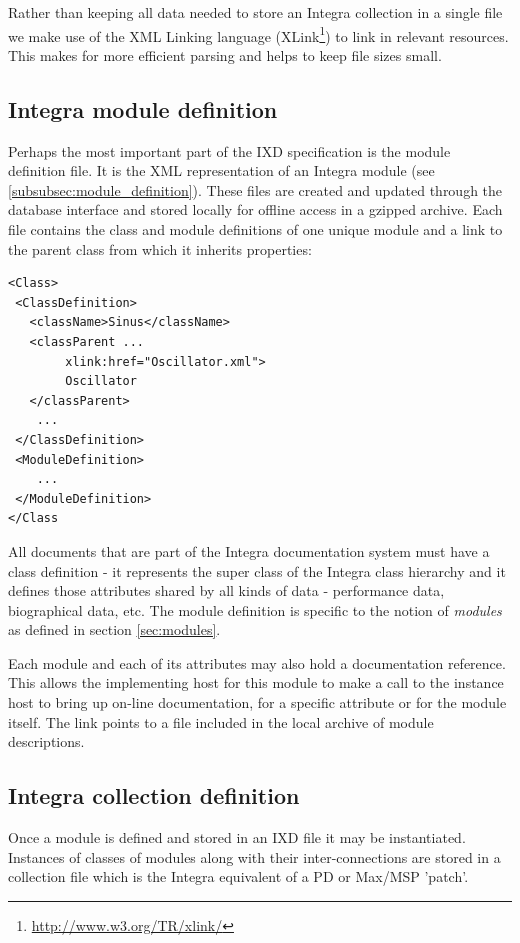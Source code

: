 Rather than keeping all data needed to store an Integra collection in a single file we make use of the XML Linking language (XLink\footnote{\url{http://www.w3.org/TR/xlink/}}) to link in relevant resources. This makes for more efficient parsing and helps to keep file sizes small.

\subsection{Integra module definition}\label{subsect:integra_class_definition}

Perhaps the most important part of the IXD specification is the module definition file. It is the XML representation of an Integra module (see \ref{subsubsec:module_definition}). These files are created and updated through the database interface and stored locally for offline access in a gzipped archive. Each file contains the class and module definitions of one unique module and a link to the parent class from which it inherits properties:

{\small
\begin{verbatim}
<Class>
 <ClassDefinition>
   <className>Sinus</className>
   <classParent ...
        xlink:href="Oscillator.xml">
        Oscillator
   </classParent>
    ...
 </ClassDefinition>
 <ModuleDefinition>
    ...
 </ModuleDefinition>
</Class
\end{verbatim}
}
All documents that are part of the Integra documentation system must have a class definition - it represents the super class of the Integra class hierarchy and it defines those attributes shared by all kinds of data - performance data, biographical data, etc. The module definition is specific to the notion of \emph{modules} as defined in section \ref{sec:modules}.

Each module and each of its attributes may also hold a documentation
reference. This allows the implementing host for this module to make a
call to the instance host to bring up on-line documentation, for a
specific attribute or for the module itself. The link points to a file
included in the local archive of module descriptions.

\subsection{Integra collection definition}\label{subsect:integra_collection_definition}

Once a module is defined and stored in an IXD file it may be instantiated. Instances of classes of modules along with their inter-connections are stored in a collection file which is the Integra equivalent of a PD or Max/MSP 'patch'.


